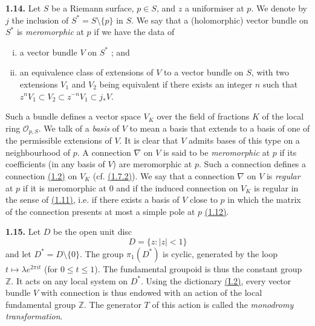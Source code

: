 \documentclass{report}
\newenvironment{rmenv}[1]
  {\phantomsection\par\medskip\noindent\textbf{#1.}\rmfamily}
  {\par\medskip}
\renewcommand{\cal}[1]{{\mathcal{#1}}}
\newcommand{\ZZ}{\mathbb{Z}}
\renewcommand{\leq}{\leqslant}
\newcommand{\oldpage}[1]{\marginpar{\footnotesize$\Big\vert$ \textit{p.~#1}}}
\begin{document}
\begin{rmenv}{1.14}
\label{II.1.14}
  Let $S$ be a Riemann surface, $p\in S$, and $z$ a uniformiser at $p$.
  We denote by $j$ the inclusion of $S^*=S\setminus\{p\}$ in $S$.
  We say that a (holomorphic) vector bundle on $S^*$ is \emph{meromorphic} at $p$ if we have the data of
  \begin{enumerate}[(i)]
    \item a vector bundle $V$ on $S^*$ ; and
    \item an equivalence class of extensions of $V$ to a vector bundle on $S$, with two extensions $V_1$ and $V_2$ being equivalent if there exists an integer $n$ such that $z^nV_1\subset V_2\subset z^{-n}V_1\subset j_*V$.
  \end{enumerate}

  Such a bundle defines a vector space $V_K$ over the field of fractions $K$ of the local ring $\cal{O}_{p,S}$.
  We talk of a \emph{basis} of $V$ to mean a basis that extends to a basis of one of the permissible extensions of $V$.
  It is clear that $V$ admits bases of this type on a neighbourhood of $p$.
  A connection $\nabla$ on $V$ is said to be \emph{meromorphic} at $p$ if its coefficients (in any basis of $V$) are meromorphic at $p$.
  Such a connection defines a connection \hyperref[II.1.2]{(1.2)} on $V_K$ (cf. \hyperref[II.1.7.2]{(1.7.2)}).
  We say that a connection $\nabla$ on $V$ is \emph{regular} at $p$ if it is meromorphic at $0$ and if the induced connection on $V_K$ is regular in the sense of \hyperref[II.1.11]{(1.11)}, i.e. if there exists a basis of $V$ close to $p$ in which the matrix of the connection presents at most a simple pole at $p$ \hyperref[II.1.12]{(1.12)}.
\end{rmenv}

\begin{rmenv}{1.15}
\label{II.1.15}
  Let $D$ be the open unit disc
  \[
    D = \{z : |z|<1\}
  \]
  and let $D^*=D\setminus\{0\}$.
  The group $\pi_1(D^*)$ is cyclic, generated by the loop
\oldpage{53}
  $t\mapsto\lambda e^{2\pi it}$ (for $0\leq t\leq1$).
  The fundamental groupoid is thus the constant group $\ZZ$.
  It acts on any local system on $D^*$.
  Using the dictionary \hyperref[I.2]{(I.2)}, every vector bundle $V$ with connection is thus endowed with an action of the local fundamental group $\ZZ$.
  The generator $T$ of this action is called the \emph{monodromy transformation}.
\end{rmenv}
\end{document}
